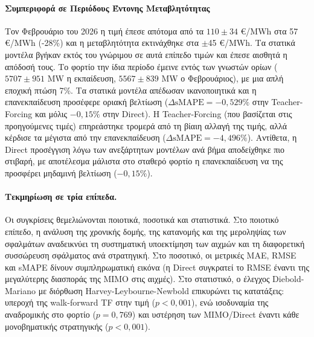 \paragraph{Συμπεριφορά σε Περιόδους Έντονης Μεταβλητότητας}
Τον Φεβρουάριο του 2026 η τιμή έπεσε απότομα από τα $110 \pm 34$ €/MWh στα 57 €/MWh (-28\%) και η μεταβλητότητα εκτινάχθηκε στα $\pm$45 €/MWh. Τα στατικά μοντέλα βγήκαν εκτός του γνώριμου σε αυτά επίπεδο τιμών και έπεσε αισθητά η απόδοσή τους.
Το φορτίο την ίδια περίοδο έμεινε εντός των γνωστών ορίων ($5707 \pm 951$ MW η εκπαίδευση, $5567 \pm 839$ MW ο Φεβρουάριος), με μια απλή εποχική πτώση 7\%. Τα στατικά μοντέλα  απέδωσαν ικανοποιητικά και η επανεκπαίδευση προσέφερε οριακή βελτίωση ($\Delta\text{sMAPE} = -0,529\%$ στην Teacher-Forcing και μόλις $-0,15\%$ στην Direct).
Η Teacher-Forcing (που βασίζεται στις προηγούμενες τιμές) επηρεάστηκε τρομερά από τη βίαιη αλλαγή της τιμής, αλλά κέρδισε τα μέγιστα από την επανεκπαίδευση ($\Delta\text{sMAPE} = -4,496\%$). Αντίθετα, η Direct προσέγγιση λόγω των ανεξάρτητων μοντέλων ανά βήμα αποδείχθηκε πιο στιβαρή, με αποτέλεσμα μάλιστα στο σταθερό φορτίο η επανεκπαίδευση να της προσφέρει μηδαμινή βελτίωση ($-0,15\%$).

 \paragraph{Τεκμηρίωση σε τρία επίπεδα.}
Οι συγκρίσεις θεμελιώνονται ποιοτικά, ποσοτικά και στατιστικά. Στο ποιοτικό επίπεδο, η
ανάλυση της χρονικής δομής, της κατανομής και της μεροληψίας των σφαλμάτων αναδεικνύει τη
συστηματική υποεκτίμηση των αιχμών και τη διαφορετική συσσώρευση σφάλματος ανά στρατηγική.
Στο ποσοτικό, οι μετρικές MAE, RMSE και sMAPE δίνουν συμπληρωματική εικόνα (η Direct
συγκρατεί το RMSE έναντι της μεγαλύτερης διασποράς της MIMO στις αιχμές). Στο στατιστικό,
ο έλεγχος Diebold-Mariano με διόρθωση Harvey-Leybourne-Newbold επικυρώνει τις κατατάξεις:
υπεροχή της walk-forward TF στην τιμή ($p<0{,}001$), ενώ ισοδυναμία της αναδρομικής στο
φορτίο ($p=0{,}769$) και υστέρηση των MIMO/Direct έναντι κάθε μονοβηματικής στρατηγικής
($p<0{,}001$).

